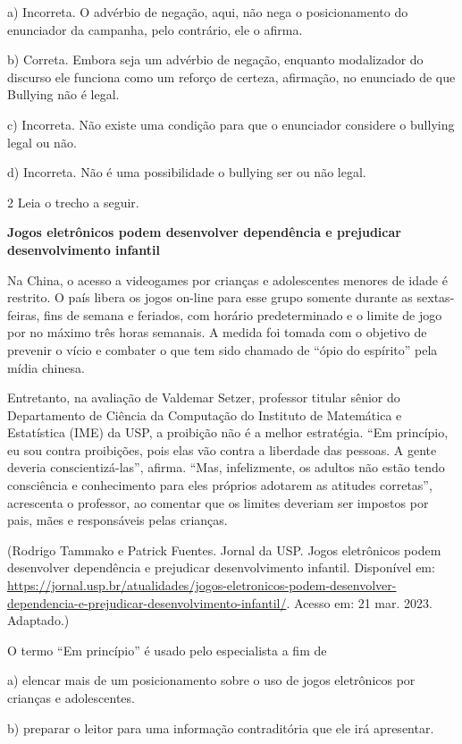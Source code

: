 a) Incorreta. O advérbio de negação, aqui, não nega o posicionamento do
enunciador da campanha, pelo contrário, ele o afirma.

b) Correta. Embora seja um advérbio de negação, enquanto modalizador do
discurso ele funciona como um reforço de certeza, afirmação, no
enunciado de que Bullying não é legal.

c) Incorreta. Não existe uma condição para que o enunciador considere o
bullying legal ou não.

d) Incorreta. Não é uma possibilidade o bullying ser ou não legal.

\num{2} Leia o trecho a seguir.

\textbf{Jogos eletrônicos podem desenvolver dependência e prejudicar
desenvolvimento infantil}

Na China, o acesso a videogames por crianças e adolescentes menores de
idade é restrito. O país libera os jogos on-line para esse grupo somente
durante as sextas-feiras, fins de semana e feriados, com horário
predeterminado e o limite de jogo por no máximo três horas semanais. A
medida foi tomada com o objetivo de prevenir o vício e combater o que
tem sido chamado de ``ópio do espírito'' pela mídia chinesa.

Entretanto, na avaliação de Valdemar Setzer, professor titular sênior do
Departamento de Ciência da Computação do Instituto de Matemática e
Estatística (IME) da USP, a proibição não é a melhor estratégia. ``Em
princípio, eu sou contra proibições, pois elas vão contra a liberdade
das pessoas. A gente deveria conscientizá-las'', afirma. ``Mas,
infelizmente, os adultos não estão tendo consciência e conhecimento para
eles próprios adotarem as atitudes corretas'', acrescenta o professor,
ao comentar que os limites deveriam ser impostos por pais, mães e
responsáveis pelas crianças.

(Rodrigo Tammako e Patrick Fuentes. Jornal da USP. Jogos eletrônicos
podem desenvolver dependência e prejudicar desenvolvimento infantil.
Disponível em: 
\url{https://jornal.usp.br/atualidades/jogos-eletronicos-podem-desenvolver-dependencia-e-prejudicar-desenvolvimento-infantil/}.
Acesso em: 21 mar. 2023. Adaptado.)

O termo ``Em princípio'' é usado pelo especialista a fim de

a) elencar mais de um posicionamento sobre o uso de jogos eletrônicos
por crianças e adolescentes.

b) preparar o leitor para uma informação contraditória que ele irá
apresentar.


